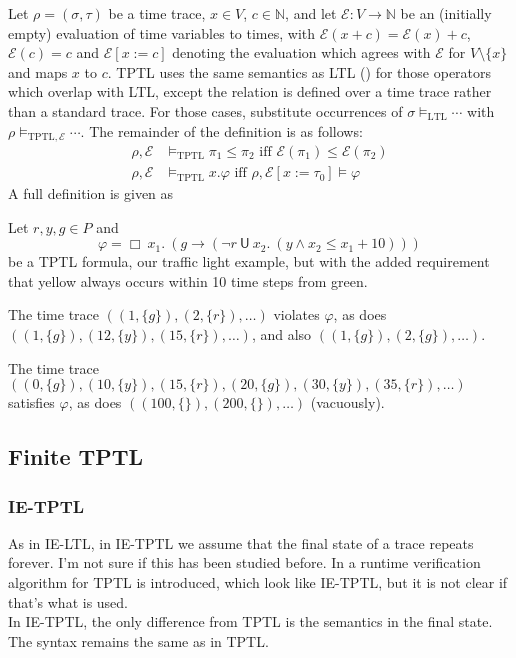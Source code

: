 \documentclass[a4paper]{article}
\newcommand{\U}{\mathsf{U}}
\newcommand{\tiff}{\text{ iff }}
\newcommand{\eval}{\mathcal{E}}
\begin{document}
\begin{defn}\label{tptlsem}

  Let $\rho = (\sigma,\tau)$ be a time trace, $x\in V$, $c\in\mathbb{N}$, and let $\eval:V\to\mathbb{N}$ be an (initially empty) evaluation of time variables to times, with $\eval(x + c) = \eval(x) + c$, $\eval(c) = c$ and $\eval[x:=c]$ denoting the evaluation which agrees with $\eval$ for $V\setminus\{x\}$ and maps $x$ to $c$.
  TPTL uses the same semantics as LTL () for those operators which overlap with LTL, except the relation is defined over a time trace rather than a standard trace. For those cases, substitute occurrences of $\sigma\vDash_{\text{LTL}}\cdots$ with $\rho\vDash_{\text{TPTL},\eval}\cdots$. The remainder of the definition is as follows:
  \begin{align*}
    \rho,\eval &\vDash_{\text{TPTL}}\pi_1\leq\pi_2 \tiff \eval(\pi_1)\leq\eval(\pi_2)\\
    \rho,\eval &\vDash_{\text{TPTL}} x.\varphi \tiff \rho,\eval[x:=\tau_0]\vDash\varphi
  \end{align*}
  A full definition is given as 
\end{defn}

\begin{eg}\label{tptleg}
  Let $r,y,g\in P$ and \[\varphi = \Box ~x_1.~ (g \to (\neg r ~\U~ x_2.~ (y \land x_2 \leq x_1 + 10) ))\] be a TPTL formula, our traffic light example, but with the added requirement that yellow always occurs within 10 time steps from green.

  The time trace $((1,\{g\}),(2,\{r\}),\dots)$ violates $\varphi$, as does $((1,\{g\}),(12,\{y\}),(15,\{r\}),\dots)$, and also $((1,\{g\}),(2,\{g\}),\dots)$.

  The time trace $((0,\{g\}),(10,\{y\}),(15,\{r\}),(20,\{g\}),(30,\{y\}),(35,\{r\}),\dots)$ satisfies $\varphi$, as does $((100,\{\}),(200,\{\}),\dots)$ (vacuously).

\end{eg}

\subsection{Finite TPTL}

\subsubsection{IE-TPTL} As in IE-LTL, in IE-TPTL we assume that the final state of a trace repeats forever.  I'm not sure if this has been studied before. In \textcite{chai2013rewriting} a runtime verification algorithm for TPTL is introduced, which look like IE-TPTL, but it is not clear if that's what is used.\\
In IE-TPTL, the only difference from TPTL is the semantics in the final state. The syntax remains the same as in TPTL.
\end{document}
